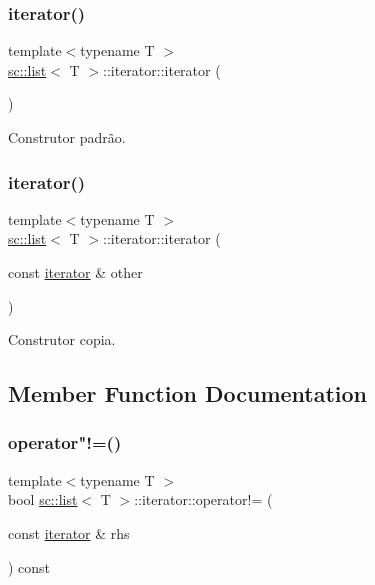 \subsubsection{\texorpdfstring{iterator()}{iterator()}\hspace{0.1cm}{\footnotesize\ttfamily [1/2]}}
{\footnotesize\ttfamily template$<$typename T $>$ \\
\hyperlink{classsc_1_1list}{sc\+::list}$<$ T $>$\+::iterator\+::iterator (\begin{DoxyParamCaption}{ }\end{DoxyParamCaption})\hspace{0.3cm}{\ttfamily [inline]}}

Construtor padrão. \mbox{\label{classsc_1_1list_1_1iterator_a730c236b34c3ffc4ec7bc40879df9b50}} 
\subsubsection{\texorpdfstring{iterator()}{iterator()}\hspace{0.1cm}{\footnotesize\ttfamily [2/2]}}
{\footnotesize\ttfamily template$<$typename T $>$ \\
\hyperlink{classsc_1_1list}{sc\+::list}$<$ T $>$\+::iterator\+::iterator (\begin{DoxyParamCaption}\item[{const \hyperlink{classsc_1_1list_1_1iterator}{iterator} \&}]{other }\end{DoxyParamCaption})\hspace{0.3cm}{\ttfamily [inline]}}

Construtor copia. 

\subsection{Member Function Documentation}
\mbox{\label{classsc_1_1list_1_1iterator_aa8328f0336cb54e2c2fbd3925db7e88b}} 
\subsubsection{\texorpdfstring{operator"!=()}{operator!=()}}
{\footnotesize\ttfamily template$<$typename T $>$ \\
bool \hyperlink{classsc_1_1list}{sc\+::list}$<$ T $>$\+::iterator\+::operator!= (\begin{DoxyParamCaption}\item[{const \hyperlink{classsc_1_1list_1_1iterator}{iterator} \&}]{rhs }\end{DoxyParamCaption}) const\hspace{0.3cm}{\ttfamily [inline]}}

